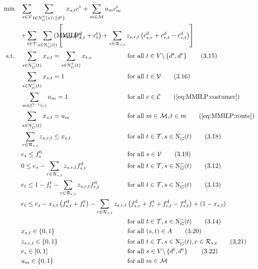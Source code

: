 \begin{align}
	\min \quad & \sum_{s\in\mathcal{V}} \sum_{t\in\Nout(s)\backslash\{d^{\operatorname{e}}\}} x_{s,t}\cv + \sum_{m\in\mathcal{M}} u_m \croute_m \nonumber \\
	& \omit\rlap{$\displaystyle{ + \sum_{t\in\mathcal{T}} \sum_{s\in\Nin(t)} \left[x_{s,t}\left(\cd_{s,t}+\ct_{t}\right) + \sum_{r\in\Rst} z_{s,r,t}\left(\cd_{s,r}+\cd_{r,t}-\cd_{s,t}\right)\right]}$} \tag{MMILP} \label{eq:MMILP} \\
	\text{s.t.} \quad & \sum_{s\in\Nin(t)} x_{s,t} = \sum_{s\in\Nout(t)} x_{t,s} & & \text{for all } t\in V\backslash\left\{d^{\operatorname{s}},d^{\operatorname{e}}\right\} \tag{3.15} \label{eq:MMILP:flow} \\
	& \sum_{s\in\Nin(t)} x_{s,t} = 1 & & \text{for all } t\in\mathcal{V} \tag{3.16} \label{eq:MMILP:vehicles} \\
	& \sum_{m\in C^{-1}(c)} u_m = 1 && \text{for all } c\in\mathcal{C} \tag{\ref{eq:MMILP:costumer}} \\
	& \sum_{s\in\Nin(t)} x_{s,t} = u_m && \text{for all } m\in\mathcal{M}, t\in m \tag{\ref{eq:MMILP:route}} \\
	& \sum_{r\in\Rst} z_{s,r,t} \leq x_{s,t} & & \text{for all } t\in\mathcal{T}, s\in\Nin(t) \tag{3.18} \label{eq:MMILP:refuel} \\
	& e_s \leq f_s^0 & & \text{for all } s\in\mathcal{V} \tag{3.19} \label{eq:MMILP:initial_fuel} \\
	& 0 \leq e_s - \sum_{r\in\Rst} z_{s,r,t}\fd_{s,r} & & \text{for all } t\in\mathcal{T}, s\in\Nin(t) \tag{3.12} \label{eq:MMILP:min_fuel} \\
	& e_t \leq 1 - \ft_t - \sum_{r\in\Rst} z_{s,r,t}\fd_{r,t} & & \text{for all } t\in\mathcal{T}, s\in\Nin(t) \tag{3.13} \label{eq:MMILP:max_fuel} \\
	& \omit\rlap{$\displaystyle{e_t \leq e_s - x_{s,t}\left(f_{s,t}^{\operatorname{d}}+f_t^{\operatorname{t}}\right) - \sum_{r\in\Rst} z_{s,r,t}\left(\fd_{s,r}+\ft_r+\fd_{r,t}-\fd_{s,t}\right) + \left(1-x_{s,t}\right)}$} \nonumber \\
	& & & \text{for all } t\in\mathcal{T}, s\in\Nin(t) \tag{3.14} \label{eq:MMILP:fuel_consumption} \\
	& x_{s,t}\in\{0,1\} & & \text{for all } (s,t)\in A \tag{3.20} \label{eq:MMILP_xst} \\
	& z_{s,r,t}\in\{0,1\} & & \text{for all } t\in\mathcal{T},s\in\Nin(t),r\in\Rst \tag{3.21} \label{eq:MMILP:zsrt} \\
	& e_s\in[0,1] & & \text{for all } s\in V\backslash\left\{d^{\operatorname{s}},d^{\operatorname{e}}\right\} \tag{3.22} \label{eq:MMILP:es} \\
	& u_m\in\{0,1\} && \text{for all } m\in\mathcal{M} \label{eq:MMILP:um}
\end{align}
